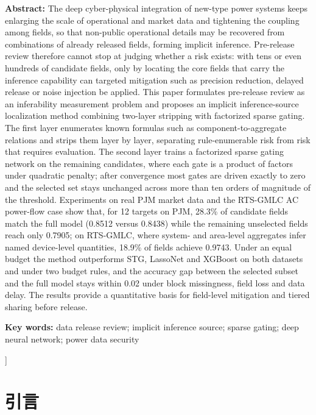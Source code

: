 \documentclass[UTF8,zihao=5,twoside]{ctexart}
\begin{document}
\noindent\textbf{Abstract:} The deep cyber-physical integration of new-type power systems keeps enlarging the scale of operational and market data and tightening the coupling among fields, so that non-public operational details may be recovered from combinations of already released fields, forming implicit inference. Pre-release review therefore cannot stop at judging whether a risk exists: with tens or even hundreds of candidate fields, only by locating the core fields that carry the inference capability can targeted mitigation such as precision reduction, delayed release or noise injection be applied. This paper formulates pre-release review as an inferability measurement problem and proposes an implicit inference-source localization method combining two-layer stripping with factorized sparse gating. The first layer enumerates known formulas such as component-to-aggregate relations and strips them layer by layer, separating rule-enumerable risk from risk that requires evaluation. The second layer trains a factorized sparse gating network on the remaining candidates, where each gate is a product of factors under quadratic penalty; after convergence most gates are driven exactly to zero and the selected set stays unchanged across more than ten orders of magnitude of the threshold. Experiments on real PJM market data and the RTS-GMLC AC power-flow case show that, for 12 targets on PJM, 28.3\% of candidate fields match the full model (0.8512 versus 0.8438) while the remaining unselected fields reach only 0.7905; on RTS-GMLC, where system- and area-level aggregates infer named device-level quantities, 18.9\% of fields achieve 0.9743. Under an equal budget the method outperforms STG, LassoNet and XGBoost on both datasets and under two budget rules, and the accuracy gap between the selected subset and the full model stays within 0.02 under block missingness, field loss and data delay. The results provide a quantitative basis for field-level mitigation and tiered sharing before release.\par
\noindent\textbf{Key words:} data release review; implicit inference source; sparse gating; deep neural network; power data security\par\vspace{0.8em}

\vspace{0.8em}
]

\section{引言}
\end{document}
